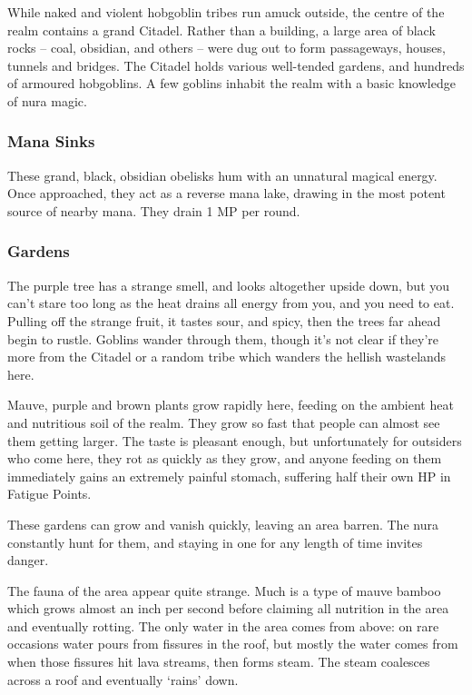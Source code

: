 \begin{multicols}{2}
While naked and violent hobgoblin tribes run amuck outside, the centre of the realm contains a grand Citadel.
Rather than a building, a large area of black rocks  -- coal, obsidian, and others -- were dug out to form passageways, houses, tunnels and bridges.
The Citadel holds various well-tended gardens, and hundreds of armoured hobgoblins.
A few goblins inhabit the realm with a basic knowledge of nura magic.

\subsubsection{Mana Sinks}

These grand, black, obsidian obelisks hum with an unnatural magical energy.
Once approached, they act as a reverse mana lake, drawing in the most potent source of nearby mana.
They drain 1 MP per round.

\subsubsection{Gardens}

\begin{boxtext}

	The purple tree has a strange smell, and looks altogether upside down, but you can't stare too long as the heat drains all energy from you, and you need to eat.
Pulling off the strange fruit, it tastes sour, and spicy, then the trees far ahead begin to rustle.
Goblins wander through them, though it's not clear if they're more from the Citadel or a random tribe which wanders the hellish wastelands here.

\end{boxtext}

Mauve, purple and brown plants grow rapidly here, feeding on the ambient heat and nutritious soil of the realm.  They grow so fast that people can almost see them getting larger.  The taste is pleasant enough, but unfortunately for outsiders who come here, they rot as quickly as they grow, and anyone feeding on them immediately gains an extremely painful stomach, suffering half their own HP in Fatigue Points.

These gardens can grow and vanish quickly, leaving an area barren.
The nura constantly hunt for them, and staying in one for any length of time invites danger.

The fauna of the area appear quite strange. Much is a type of mauve bamboo which grows almost an inch per second before claiming all nutrition in the area and eventually rotting.  The only water in the area comes from above: on rare occasions water pours from fissures in the roof, but mostly the water comes from when those fissures hit lava streams, then forms steam.  The steam coalesces across a roof and eventually `rains' down.


\end{multicols}
